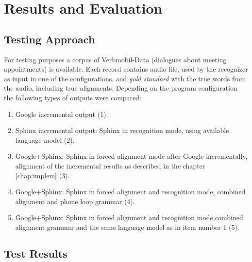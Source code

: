 \chapter{Results and Evaluation}
\label{chap:res}
 \section {Testing Approach} 
For testing purposes  a corpus of  Verbmobil-Data (dialogues about meeting
appointments)  is available.  Each record contains audio file, used by the recognizer as input in
one of the configurations,  and \textit {gold standard}
with the true words from the audio, including true alignments.  Depending on the program configuration 
 the following types of outputs were compared:
\begin {enumerate}
  \item Google incremental output (1).
  \item Sphinx incremental output: Sphinx in recognition mode, using available
  language model (2).
  \item Google+Sphinx: Sphinx in forced alignment mode after Google
  incrementally, alignment of the incremental results as described in the
  chapter \ref {chap:implem} (3).
  \item Google+Sphinx: Sphinx in forced alignment and recognition mode,
  combined alignment and phone loop grammar (4).
  \item Google+Sphinx: Sphinx in forced alignment and recognition mode,combined
  alignment grammar and the same language model as in item number 1 (5). 
\end{enumerate}
\section {Test Results} 
